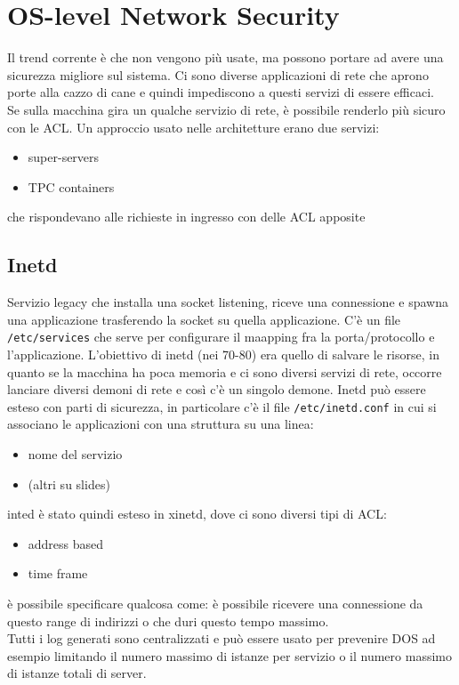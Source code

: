 \documentclass[12pt, oneside]{extbook} %
\begin{document}
\section{OS-level Network Security}
Il trend corrente è che non vengono più usate, ma possono portare ad avere una sicurezza migliore sul sistema. Ci sono diverse applicazioni di rete che aprono porte alla cazzo di cane e quindi impediscono a questi servizi di essere efficaci.\\Se sulla macchina gira un qualche servizio di rete, è possibile renderlo più sicuro con le ACL. Un approccio usato nelle architetture erano due servizi:
\begin{itemize}
\item super-servers
\item TPC containers
\end{itemize}
che rispondevano alle richieste in ingresso con delle ACL apposite
\subsection{Inetd}
Servizio legacy che installa una socket listening, riceve una connessione e spawna una applicazione trasferendo la socket su quella applicazione. C'è un file \texttt{/etc/services} che serve per configurare il maapping fra la porta/protocollo e l'applicazione. L'obiettivo di inetd (nei 70-80) era quello di salvare le risorse, in quanto se la macchina ha poca memoria e ci sono diversi servizi di rete, occorre lanciare diversi demoni di rete e così c'è un singolo demone. Inetd può essere esteso con parti di sicurezza, in particolare c'è il file \texttt{/etc/inetd.conf} in cui si associano le applicazioni con una struttura su una linea:
\begin{itemize}
\item nome del servizio
\item (altri su slides)
\end{itemize}
inted è stato quindi esteso in xinetd, dove ci sono diversi tipi di ACL:
\begin{itemize}
\item address based
\item time frame
\end{itemize}
è possibile specificare qualcosa come: è possibile ricevere una connessione da questo range di indirizzi o che duri questo tempo massimo.\\Tutti i log generati sono centralizzati e può essere usato per prevenire DOS ad esempio limitando il numero massimo di istanze per servizio o il numero massimo di istanze totali di server.
\end{document}
